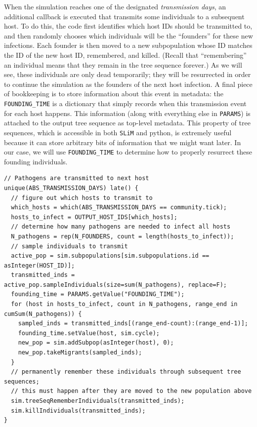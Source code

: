 \documentclass[12pt]{article}
\newcommand{\slim}[0]{\texttt{SLiM}\xspace}
\begin{document}
When the simulation reaches one of the designated \textit{transmission days},
an additional callback is executed that transmits some individuals to a subsequent host.
To do this, the code first identifies which host IDs should be transmitted to,
and then randomly chooses which individuals will be the ``founders'' for these new infections.
Each founder is then moved to a new subpopulation whose ID matches the ID of the new host ID,
remembered, and killed.
(Recall that ``remembering'' an individual means that they remain in the tree sequence forever.)
As we will see, these individuals are only dead temporarily;
they will be resurrected in order to
continue the simulation as the founders of the next host infection.
 A final piece of bookkeeping is to store information about this event in metadata:
the \verb|FOUNDING_TIME| is a dictionary that simply records when this transmission event for each host happens.
This information (along with everything else in \verb|PARAMS|)
is attached to the output tree sequence as top-level metadata.
This property
of tree sequences, which is accessible in both \slim and python, is extremely useful because it can store arbitrary bits of information that we might want later.
In our case,
we will use \verb|FOUNDING_TIME| to determine how to properly resurrect these founding individuals.
\begin{lstlisting}[language=slim, style=slimstyle, breaklines=true]
// Pathogens are transmitted to next host
unique(ABS_TRANSMISSION_DAYS) late() {
  // figure out which hosts to transmit to
  which_hosts = which(ABS_TRANSMISSION_DAYS == community.tick);
  hosts_to_infect = OUTPUT_HOST_IDS[which_hosts];
  // determine how many pathogens are needed to infect all hosts
  N_pathogens = rep(N_FOUNDERS, count = length(hosts_to_infect));
  // sample individuals to transmit
  active_pop = sim.subpopulations[sim.subpopulations.id == asInteger(HOST_ID)];
  transmitted_inds = active_pop.sampleIndividuals(size=sum(N_pathogens), replace=F);
  founding_time = PARAMS.getValue("FOUNDING_TIME");
  for (host in hosts_to_infect, count in N_pathogens, range_end in cumSum(N_pathogens)) {
    sampled_inds = transmitted_inds[(range_end-count):(range_end-1)];
    founding_time.setValue(host, sim.cycle);
    new_pop = sim.addSubpop(asInteger(host), 0);
    new_pop.takeMigrants(sampled_inds);
  }
  // permanently remember these individuals through subsequent tree sequences;
  // this must happen after they are moved to the new population above
  sim.treeSeqRememberIndividuals(transmitted_inds);
  sim.killIndividuals(transmitted_inds);
}
\end{lstlisting}
\end{document}
